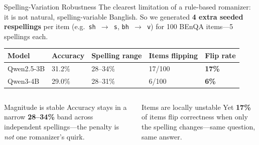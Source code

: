 \documentclass[aspectratio=169,10pt]{beamer}
\begin{document}
\begin{frame}{Spelling-Variation Robustness}
\small
The clearest limitation of a rule-based romanizer: it is not natural, spelling-variable Banglish. So we generated \textbf{4 extra seeded respellings} per item (e.g.\ \texttt{sh\,$\to$\,s}, \texttt{bh\,$\to$\,v}) for 100 BEnQA items—5 spellings each.
\vspace{0.3cm}

\centering
\renewcommand{\arraystretch}{1.3}
\begin{tabular}{L{2.8cm} C{1.6cm} C{1.9cm} C{1.7cm} C{1.4cm}}
\toprule
\textbf{Model} & \textbf{Accuracy} & \textbf{Spelling range} & \textbf{Items flipping} & \textbf{Flip rate}\\
\midrule
Qwen2.5-3B & 31.2\% & 28--34\% & 17/100 & \textbf{17\%}\\
Qwen3-4B   & 29.0\% & 28--31\% & 6/100  & \textbf{6\%}\\
\bottomrule
\end{tabular}
\vspace{0.35cm}

\begin{columns}[T]
\begin{takebox}{Magnitude is stable}
\small Accuracy stays in a narrow \textbf{28--34\%} band across independent spellings—the penalty is \emph{not} one romanizer's quirk.
\end{takebox}
\begin{takebox}{Items are locally unstable}
\small Yet \textbf{17\%} of items flip correctness when only the spelling changes—same question, same answer.
\end{takebox}
\end{columns}
\end{frame}

\end{document}
